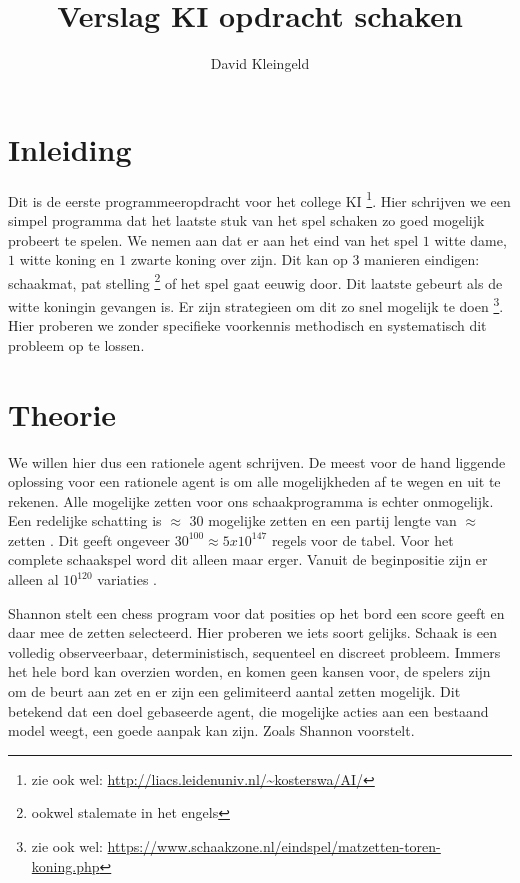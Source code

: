 \documentclass[10pt]{article}
\author{David Kleingeld}
\title{Verslag KI opdracht schaken }
\begin{document}

\maketitle

\section{Inleiding}

Dit is de eerste programmeeropdracht voor het college KI \footnote{zie ook wel: \url{http://liacs.leidenuniv.nl/~kosterswa/AI/}}. Hier schrijven we een simpel programma dat het laatste stuk van het spel schaken zo goed mogelijk probeert te spelen. We nemen aan dat er aan het eind van het spel $1$ witte dame, $1$ witte koning en $1$ zwarte koning over zijn. Dit kan op 3 manieren eindigen: schaakmat, pat stelling \footnote{ookwel stalemate in het engels} of het spel gaat eeuwig door. Dit laatste gebeurt als de witte koningin gevangen is. Er zijn strategieen om dit zo snel mogelijk te doen \footnote{zie ook wel: \url{https://www.schaakzone.nl/eindspel/matzetten-toren-koning.php}}. Hier proberen we zonder specifieke voorkennis methodisch en systematisch dit probleem op te lossen.

\section{Theorie}

We willen hier dus een rationele agent schrijven. De meest voor de hand liggende oplossing voor een rationele agent is om alle mogelijkheden af te wegen en uit te rekenen. Alle mogelijke zetten voor ons schaakprogramma is echter onmogelijk. Een redelijke schatting is $\approx$ 30 \cite{Shannon:1988} mogelijke zetten en een partij lengte van $\approx$ zetten \cite{kosters:lecture2:sheet9}. Dit geeft ongeveer $30^{100} \approx 5x10^{147}$ regels voor de tabel. Voor het complete schaakspel word dit alleen maar erger. Vanuit de beginpositie zijn er alleen al $10^{120}$ variaties \cite{Shannon:1988}.

Shannon stelt een chess program voor dat posities op het bord een score geeft en daar mee de zetten selecteerd. Hier proberen we iets soort gelijks. Schaak is een volledig observeerbaar, deterministisch, sequenteel en discreet probleem. Immers het hele bord kan overzien worden, en komen geen kansen voor, de spelers zijn om de beurt aan zet en er zijn een gelimiteerd aantal zetten mogelijk. Dit betekend dat een doel gebaseerde agent, die mogelijke acties aan een bestaand model weegt, een goede aanpak kan zijn. Zoals Shannon voorstelt.
\end{document}
